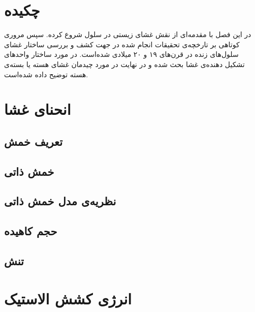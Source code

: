 \setRL
\clearpage

\def \MemTB {\Mempath /MembraneTheoreticalBackground}

\section{
چکیده
}
در این فصل با مقدمه‌ای از نقش غشای زیستی در سلول شروع کرده. سپس مروری کوتاهی بر تارخچه‌ی تحقیقات انجام شده در جهت کشف و بررسی ساختار غشای سلول‌های زنده در قرن‌های ۱۹ و ۲۰ میلادی شده‌است. در مورد ساختار واحد‌های تشکیل دهنده‌ی غشا بحث شده و در نهایت در مورد چیدمان غشای هسته یا بسته‌ی هسته توضیح داده شده‌است.

\section{
انحنای غشا
}
\subsection{
تعریف خمش
}


\subsection{
خمش ذاتی
}


\subsection{
نظریه‌ی مدل خمش ذاتی
\label{sec:spontaneousCurvatureModel}
}

\subsection{
حجم کاهیده
}

\subsection{
تنش 
}


\section{
انرژی کشش الاستیک
}











